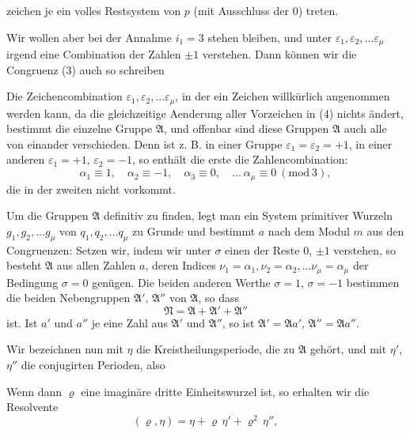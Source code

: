 zeichen je ein volles Restsystem von $p$ (mit Ausschluss der 0) treten.

Wir wollen aber bei der Annahme $i_1=3$ stehen bleiben, und unter $\varepsilon_1, \varepsilon_2, \ldots \varepsilon_\mu$ irgend eine Combination der Zahlen $\pm 1$ verstehen. Dann können wir die Congruenz (3) auch so schreiben

Die Zeichencombination $\varepsilon_1, \varepsilon_2, \ldots \varepsilon_\mu$, in der ein Zeichen willkürlich angenommen werden kann, da die gleichzeitige Aenderung aller Vorzeichen in (4) nichts ändert, bestimmt die einzelne Gruppe $\mathfrak{A}$, und offenbar sind diese Gruppen $\mathfrak{A}$ auch alle von einander verschieden. Denn ist z. B. in einer Gruppe $\varepsilon_1=\varepsilon_2=+1$, in einer anderen $\varepsilon_1=+1$, $\varepsilon_2=-1$, so enthält die erste die Zahlencombination:
\[
\alpha_1\equiv 1,\quad \alpha_2\equiv -1,\quad \alpha_3\equiv 0,\quad \ldots\ \alpha_\mu\equiv 0\ (\mathrm{mod}\ 3),
\]
die in der zweiten nicht vorkommt.

Um die Gruppen $\mathfrak{A}$ definitiv zu finden, legt man ein System primitiver Wurzeln $g_1, g_2, \ldots g_\mu$ von $q_1, q_2, \ldots q_\mu$ zu Grunde und bestimmt $a$ nach dem Modul $m$ aus den Congruenzen:
Setzen wir, indem wir unter $\sigma$ einen der Reste 0, $\pm 1$ verstehen,
so besteht $\mathfrak{A}$ aus allen Zahlen $a$, deren Indices $\nu_1=\alpha_1, \nu_2=\alpha_2, \ldots \nu_\mu=\alpha_\mu$ der Bedingung $\sigma=0$ genügen. Die beiden anderen Werthe $\sigma=1$, $\sigma=-1$ bestimmen die beiden Nebengruppen
$\mathfrak{A}'$, $\mathfrak{A}''$ von $\mathfrak{A}$, so dass
\[
\mathfrak{N} = \mathfrak{A} + \mathfrak{A}' + \mathfrak{A}''
\]
ist. Ist $a'$ und $a''$ je eine Zahl aus $\mathfrak{A}'$ und $\mathfrak{A}''$, so ist $\mathfrak{A}'=\mathfrak{A}a'$, $\mathfrak{A}''=\mathfrak{A}a''$.

Wir bezeichnen nun mit $\eta$ die Kreistheilungsperiode, die zu $\mathfrak{A}$ gehört, und mit $\eta'$, $\eta''$ die conjugirten Perioden, also

Wenn dann $\varrho$ eine imaginäre dritte Einheitswurzel ist, so erhalten wir die Resolvente
\[
(\varrho, \eta) = \eta + \varrho\,\eta' + \varrho^2\,\eta'',
\]
